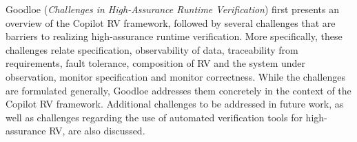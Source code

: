 

Goodloe
\cite{isola-2016-goodloe}
({\em Challenges in High-Assurance Runtime Verification}) 
first presents an overview of the Copilot RV framework, followed by
several challenges that are barriers to realizing
high-assurance runtime verification. More specifically, these
challenges relate
specification, observability of data, traceability from requirements,
fault tolerance, composition of RV and the system under observation,
monitor specification and monitor correctness. 
While the challenges are formulated generally, Goodloe addresses them
concretely in the context of the Copilot RV framework.
Additional challenges to be addressed in future work, as well as challenges regarding the use of automated verification tools for high-assurance RV, are also discussed. 

